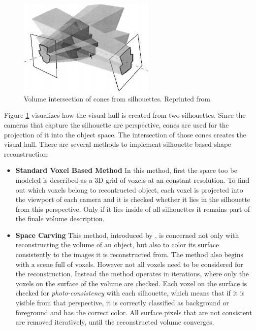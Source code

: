 \begin{figure}[hbt]
	\centering
	\includegraphics[width=0.6\textwidth, keepaspectratio]{resources/volume_intersection_bottino}
	\caption[Volume intersection of cones from silhouettes]{\label{fig:sota:volumeintersection} Volume intersection of cones from silhouettes.
	Reprinted from \textcite[][]{bottino2001silhouette}}
\end{figure}

Figure \ref{fig:sota:volumeintersection} visualizes how the visual hull is created from two silhouettes. 
Since the cameras that capture the silhouette are perspective,
cones are used for the projection of it into the object space.
The intersection of those cones creates the visual hull.
There are several methods to implement silhouette based shape reconstruction:

\begin{itemize}
    \item \textbf{Standard Voxel Based Method} 
    In this method, first the space too be modeled is described as a \ac{3D} grid of voxels at an constant resolution.
    To find out which voxels belong to recontructed object,
    each voxel is projected into the viewport of each camera 
    and it is checked whether it lies in the silhouette from this perspective.
    Only if it lies inside of all silhouettes
    it remains part of the finale volume description.
    \item \textbf{Space Carving}
    This method, introduced by \textcite[][]{kutulakos1999spacecarving},
    is concerned not only with reconstructing the volume of an object, but also to color its surface consistently to the images it is reconstructed from.
    The method also begins with a scene full of voxels. 
    However not all voxels need to be considered for the reconstruction.
    Instead the method operates in iterations, where only the voxels on the surface of the volume are checked.
    Each voxel on the surface is checked for \emph{photo-consistency} with each silhouette, which means that if it is visible from that perspective, it is correctly classified as background or foreground and has the correct color.
    All surface pixels that are not consistent are removed iteratively, until the reconstructed volume converges.
\end{itemize}

